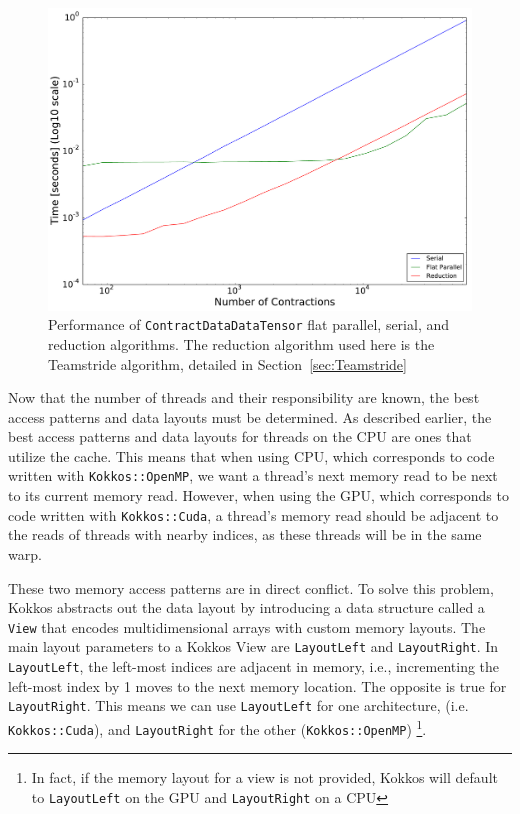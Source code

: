 \begin{figure}[!ht]
\includegraphics[width=5in]{CDDT2D}
\caption[\texttt{ContractDataDataTensor} performance 2d summary]{Performance of
\texttt{ContractDataDataTensor} flat parallel, serial, and reduction algorithms.
The reduction algorithm used here is the Teamstride algorithm, detailed in
Section~\ref{sec:Teamstride}}
\label{fig:CDDT2d} 
\end{figure}

Now that the number of threads and their responsibility are known, the best
access patterns and data layouts must be determined. As described earlier, the
best access patterns and data layouts for threads on the CPU are ones that
utilize the cache. This means that when using CPU, which corresponds to code
written with \texttt{Kokkos::OpenMP}, we want a thread's next memory read to be
next to its current memory read.  However, when using the GPU, which corresponds
to code written with \texttt{Kokkos::Cuda}, a thread's memory read should be
adjacent to the reads of threads with nearby indices, as these threads will be
in the same warp. 

These two memory access patterns are in direct conflict. To solve this problem,
Kokkos abstracts out the data layout by introducing a data structure called a
\texttt{View} that encodes multidimensional arrays with custom memory layouts. The main
layout parameters to a Kokkos View are \texttt{LayoutLeft} and
\texttt{LayoutRight}. In \texttt{LayoutLeft}, the left-most indices are adjacent
in memory, i.e., incrementing the left-most index by 1 moves to the next memory
location.  The opposite is true for \texttt{LayoutRight}.  This means we can use
\texttt{LayoutLeft} for one architecture, (i.e.  \texttt{Kokkos::Cuda}), and
\texttt{LayoutRight} for the other (\texttt{Kokkos::OpenMP}) \footnote{In fact,
if the memory layout for a view is not provided, Kokkos will default to
\texttt{LayoutLeft} on the GPU and \texttt{LayoutRight} on a CPU}. 

